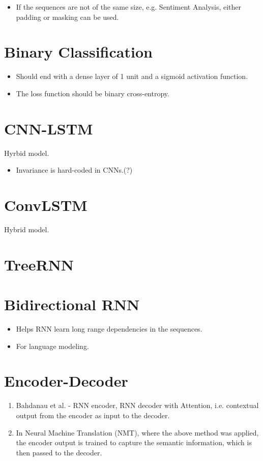 \documentclass[a4paper, 12pt]{report}
\begin{document}
\begin{itemize}
\item If the sequences are not of the same size, e.g. Sentiment Analysis, either padding or masking can be used.
\end{itemize}

\section{Binary Classification}
\begin{itemize}
\item Should end with a dense layer of 1 unit and a sigmoid activation function.
\item The loss function should be binary cross-entropy.
\end{itemize}

\section{CNN-LSTM}
\label{sec:cnn-lstm}
Hyrbid model.

\begin{itemize}
\item {\color{red}Invariance is hard-coded in CNNs.(?)}

\end{itemize}

\section{ConvLSTM}
Hybrid model.
\section{TreeRNN}

\section{Bidirectional RNN}
\begin{itemize}
\item Helps RNN learn long range dependencies in the sequences.
\item For language modeling.
\end{itemize}

\section{Encoder-Decoder}
\label{sec:enc-dec}
\begin{enumerate}
\item Bahdanau et al. - RNN encoder, RNN decoder with Attention, i.e. contextual output from the encoder as input to the decoder.
\item In Neural Machine Translation (NMT), where the above method was applied, the encoder output is trained to capture the semantic information, which is then passed to the decoder.
\end{enumerate}
\end{document}

